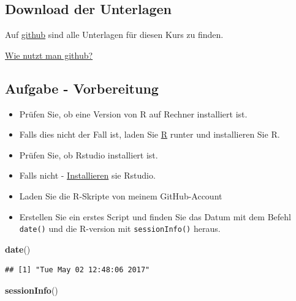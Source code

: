 \documentclass[]{article}
\newenvironment{Shaded}{\begin{snugshade}}{\end{snugshade}}
\newcommand{\KeywordTok}[1]{\textcolor[rgb]{0.13,0.29,0.53}{\textbf{{#1}}}}
\newcommand{\NormalTok}[1]{{#1}}
\providecommand{\tightlist}{%
  \setlength{\itemsep}{0pt}\setlength{\parskip}{0pt}}
\begin{document}
\subsection{Download der Unterlagen}\label{download-der-unterlagen}

Auf \href{https://github.com/Japhilko/IntroR/tree/master/2017}{github}
sind alle Unterlagen für diesen Kurs zu finden.

\href{https://guides.github.com/activities/hello-world/}{Wie nutzt man
github?}

\subsection{Aufgabe - Vorbereitung}\label{aufgabe---vorbereitung}

\begin{itemize}
\tightlist
\item
  Prüfen Sie, ob eine Version von R auf Rechner installiert ist.
\item
  Falls dies nicht der Fall ist, laden Sie \href{r-project.org}{R}
  runter und installieren Sie R.
\item
  Prüfen Sie, ob Rstudio installiert ist.
\item
  Falls nicht - \href{http://www.rstudio.com/}{Installieren} sie
  Rstudio.
\item
  Laden Sie die R-Skripte von meinem GitHub-Account
\item
  Erstellen Sie ein erstes Script und finden Sie das Datum mit dem
  Befehl \texttt{date()} und die R-version mit \texttt{sessionInfo()}
  heraus.
\end{itemize}

\begin{Shaded}
\begin{Highlighting}[]
\KeywordTok{date}\NormalTok{()}
\end{Highlighting}
\end{Shaded}

\begin{verbatim}
## [1] "Tue May 02 12:48:06 2017"
\end{verbatim}

\begin{Shaded}
\begin{Highlighting}[]
\KeywordTok{sessionInfo}\NormalTok{()}
\end{Highlighting}
\end{Shaded}
\end{document}
